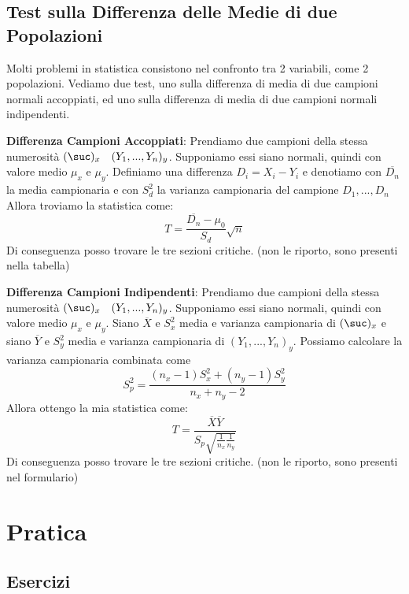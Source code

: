 \subsection{Test sulla Differenza delle Medie di due Popolazioni}

Molti problemi in statistica consistono nel confronto tra 2 variabili, come 2 popolazioni. Vediamo due test, uno sulla differenza di media di due campioni normali accoppiati, ed uno sulla differenza di media di due campioni normali indipendenti. \n

\ind \textbf{Differenza Campioni Accoppiati}: Prendiamo due campioni della stessa numerosità $(\suc)_x \quad (Y_1, ..., Y_n)_y$. Supponiamo essi siano normali, quindi con  valore medio $\mu_x$ e $\mu_y$. Definiamo una differenza $D_i = X_i - Y_i$ e denotiamo con $\overline{D_n}$ la media campionaria e con $S_d^2$ la varianza campionaria del campione $D_1, ..., D_n$ Allora troviamo la statistica come: $$T = \dfrac{\overline{D_n} - \mu_0}{S_d} \sqrt{n}$$ Di conseguenza posso trovare le  tre sezioni critiche. {\color{gray}(non le riporto, sono presenti nella tabella)} \n

\ind \textbf{Differenza Campioni Indipendenti}: Prendiamo due campioni della stessa numerosità $(\suc)_x \quad (Y_1, ..., Y_n)_y$. Supponiamo essi siano normali, quindi con  valore medio $\mu_x$ e $\mu_y$. Siano $\overline{X}$ e $S_x^2$ media e varianza campionaria di $(\suc)_x$ e siano $\overline{Y}$ e $S_y^2$ media e varianza campionaria di $(Y_1, ..., Y_n)_y$. 
Possiamo calcolare la varianza campionaria combinata come $$S_p^2 = \dfrac{(n_x - 1)S_x^2 + (n_y - 1)S_y^2}{n_x + n_y -2}$$ Allora ottengo la mia statistica come: $$T = \dfrac{\overline{X} \overline{Y}}{S_p \sqrt{\frac{1}{n_x}\frac{1}{n_y}}}$$ Di conseguenza posso trovare le  tre sezioni critiche. {\color{gray}(non le riporto, sono presenti nel formulario)} \n

\newpage

\section{Pratica}

\subsection{Esercizi}

